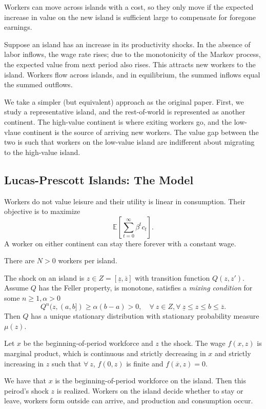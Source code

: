 \documentclass{tufte-handout}
\newcommand*\E{\mathbb{E}}
\theoremstyle{definition}
\begin{document}
Workers can move across islands with a cost, so they only move if the expected increase in value on the new island is sufficient large to compensate for foregone earnings.

Suppose an island has an increase in its productivity shocks. In the absence of labor inflows, the wage rate rises; due to the monotonicity of the Markov process, the expected value from next period also rises. This attracts new workers to the island. 
Workers flow across islands, and in equilibrium, the summed inflows equal the summed outflows.

We take a simpler (but equivalent) approach as the original paper. First, we study a representative island, and the rest-of-world is represented as another continent. The high-value continent is where exiting workers go, and the low-vlaue continent is the source of arriving new workers. The value gap between the two is such that workers on the low-value island are indifferent about migrating to the high-value island.

\subsection{Lucas-Prescott Islands: The Model}

 Workers do not value leisure and their utility is linear in consumption. Their objective is to maximize \[
	\E\left[\sum\limits_{t=0}^{\infty} \beta^{t}c_t\right] 
.\] A worker on either continent can stay there forever with a constant wage.

 There are $N>0$ workers per island.

 The shock on an island is $z \in Z = \left[ \underline{z} , \overline{z} \right]$ with transition function $Q(z,z')$. Assume $Q$ has the Feller property, is monotone, satisfies a \emph{mixing condition} for some $n \ge 1, \alpha > 0$ \[
	Q^n(z,(a,b]) \ge \alpha(b-a) > 0, \quad \forall\ z\in Z, \forall\ \underline{z} \le z \le b \le \overline{z}
.\] Then $Q$ has a unique stationary distribution with stationary probability measure $\mu(z)$.

 Let $x$ be the beginning-of-period workforce and $z$ the shock. The wage $f(x,z)$ is marginal product, which is continuous and strictly decreasing in $x$ and strictly increasing in $z$ such that 
 $\forall\ z$, $f(0,z)$ is finite and $f(\overline{x}, z) = 0$.

 We have that $x$ is the beginning-of-period workforce on the island. Then this peirod's shock $z$ is realized. Workers on the island decide whether to stay or leave, workers form outside can arrive, and production and consumption occur.
\end{document}
